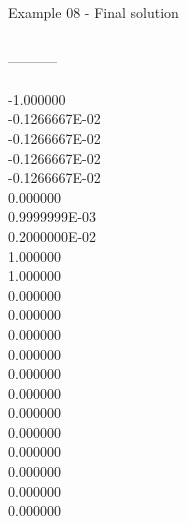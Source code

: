 \begin{frame}{Example 08 - Final solution}
\begin{columns}[t]
\begin{column}{0.3\textwidth}
-----------\\
\\
-1.000000\\
-0.1266667E-02\\
-0.1266667E-02\\
-0.1266667E-02\\
-0.1266667E-02\\
0.000000\\
0.9999999E-03\\
0.2000000E-02\\
1.000000\\
1.000000\\
0.000000\\
0.000000\\
0.000000\\
0.000000\\
0.000000\\
0.000000\\
0.000000\\
0.000000\\
0.000000\\
0.000000\\
0.000000\\
0.000000\\

                           
\end{column}
\end{columns}  

\end{frame}
